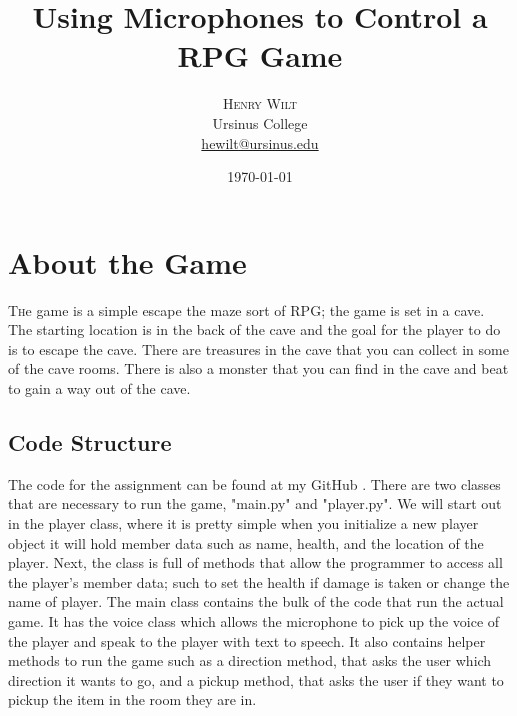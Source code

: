 \documentclass[twoside,twocolumn]{article}
\title{Using Microphones to Control a RPG Game} %
\author{%
\textsc{Henry Wilt} \\[1ex]%
\normalsize Ursinus College \\ %
\normalsize \href{mailto:hewilt@ursinus.edu}{hewilt@ursinus.edu} %
}
\date{\today} %
\begin{document}
\maketitle


\section{About the Game}

\lettrine[nindent=0em,lines=2]{T} he game is a simple escape the maze sort of RPG; the game is set in a cave. The starting location is in the back of the cave and the goal for the player to do is to escape the cave. There are treasures in the cave that you can collect in some of the cave rooms. There is also a monster that you can find in the cave and beat to gain a way out of the cave. 

\subsection{Code Structure}
The code for the assignment can be found at my GitHub \cite{assignmentgithub}. There are two classes that are necessary to run the game, "main.py" and "player.py". We will start out in the player class, where it is pretty simple when you initialize a new player object it will hold member data such as name, health, and the location of the player. Next, the class is full of methods that allow the programmer to access all the player's member data; such to set the health if damage is taken or change the name of player. The main class contains the bulk of the code that run the actual game. It has the voice class which allows the microphone to pick up the voice of the player and speak to the player with text to speech. It also contains helper methods to run the game such as a direction method, that asks the user which direction it wants to go, and a pickup method, that asks the user if they want to pickup the item in the room they are in.

\end{document}
